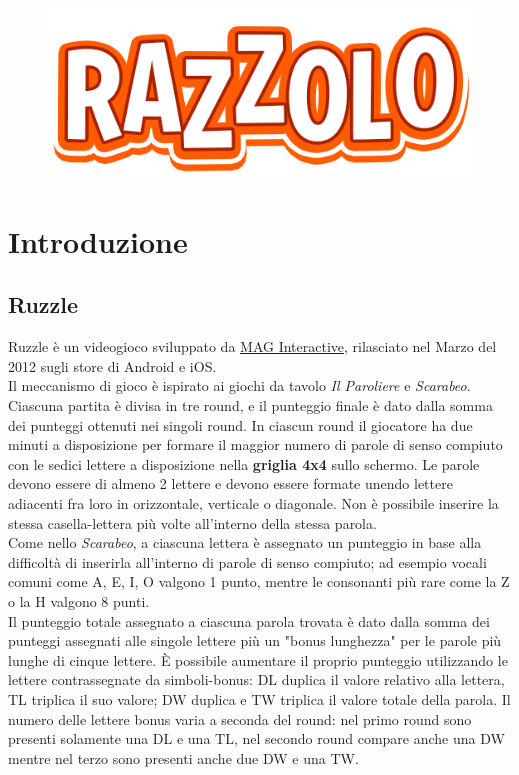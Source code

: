 \documentclass[10pt,a4paper]{article}
\title{}
\author{Antonio Facchiano\\Salvatore Ruocco\\Simone Vittoria}
\date{9 Gennaio 2024}
\begin{document}
	\begin{figure}
		\centering
		\includegraphics[scale=0.5]{icon}
	\end{figure}
	
	\maketitle
	\newpage
	{
		\hypersetup{linkcolor=black}
		\tableofcontents
	}
	\newpage
	\section{Introduzione}
	\subsection{Ruzzle}
	Ruzzle è un videogioco sviluppato da \href{https://www.maginteractive.com}{MAG Interactive}, rilasciato nel Marzo del 2012 sugli store di Android e iOS.\\
	Il meccanismo di gioco è ispirato ai giochi da tavolo \textit{Il Paroliere} e \textit{Scarabeo}.\\
	Ciascuna partita è divisa in tre round, e il punteggio finale è dato dalla somma dei punteggi ottenuti nei singoli round. In ciascun round il giocatore ha due minuti a disposizione per formare il maggior numero di parole di senso compiuto con le sedici lettere a disposizione nella \textbf{griglia 4x4} sullo schermo. Le parole devono essere di almeno 2 lettere e devono essere formate unendo lettere adiacenti fra loro in orizzontale, verticale o diagonale. Non è possibile inserire la stessa casella-lettera più volte all'interno della stessa parola.\\
	Come nello \textit{Scarabeo}, a ciascuna lettera è assegnato un punteggio in base alla difficoltà di inserirla all'interno di parole di senso compiuto; ad esempio vocali comuni come A, E, I, O valgono 1 punto, mentre le consonanti più rare come la Z o la H valgono 8 punti.\\
	Il punteggio totale assegnato a ciascuna parola trovata è dato dalla somma dei punteggi assegnati alle singole lettere più un "bonus lunghezza" per le parole più lunghe di cinque lettere. È possibile aumentare il proprio punteggio utilizzando le lettere contrassegnate da simboli-bonus: DL duplica il valore relativo alla lettera, TL triplica il suo valore; DW duplica e TW triplica il valore totale della parola. Il numero delle lettere bonus varia a seconda del round: nel primo round sono presenti solamente una DL e una TL, nel secondo round compare anche una DW mentre nel terzo sono presenti anche due DW e una TW. 
\end{document}
